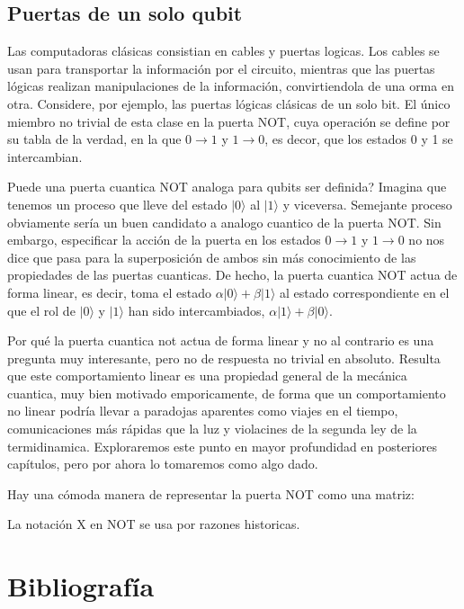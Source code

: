 \documentclass[a4paper]{article}
\begin{document}
  		\subsection{Puertas de un solo qubit}
  			Las computadoras clásicas consistian en cables y puertas logicas. Los cables se usan para transportar la información por el circuito, mientras que las puertas lógicas realizan manipulaciones de la información, convirtiendola de una orma en otra. Considere, por ejemplo, las puertas lógicas clásicas de un solo bit. El único miembro no trivial de esta clase en la puerta NOT, cuya operación se define por su tabla de la verdad, en la que $0 \rightarrow 1$ y $1 \rightarrow 0$, es decor, que los estados 0 y 1 se intercambian.
  
  Puede una puerta cuantica NOT analoga para qubits ser definida? Imagina que tenemos un proceso que lleve del estado $|0\rangle$ al $|1\rangle$ y viceversa. Semejante proceso obviamente sería un buen candidato a analogo cuantico de la puerta NOT. Sin embargo, especificar la acción de la puerta en los estados $0 \rightarrow 1$ y $1 \rightarrow 0$ no nos dice que pasa para la superposición de ambos sin más conocimiento de las propiedades de las puertas cuanticas. De hecho, la puerta cuantica NOT actua de forma linear, es decir, toma el estado $\alpha|0\rangle+ \beta|1\rangle$ al estado correspondiente en el que el rol de $|0\rangle$ y $|1\rangle$ han sido intercambiados, $\alpha|1\rangle+ \beta|0\rangle$.

Por qué la puerta cuantica not actua de forma linear y no al contrario es una pregunta muy interesante, pero no de respuesta no trivial en absoluto. Resulta que este comportamiento linear es una propiedad general de la mecánica cuantica, muy bien motivado emporicamente, de forma que un comportamiento no linear podría llevar a paradojas aparentes como viajes en el tiempo, comunicaciones más rápidas que la luz y violacines de la segunda ley de la termidinamica. Exploraremos este punto en mayor profundidad en posteriores capítulos, pero por ahora lo tomaremos como algo dado.

Hay una cómoda manera de representar la puerta NOT como una matriz:

La notación X en NOT se usa por razones historicas.
  	\appendix
	\section{Bibliografía}
		
\end{document}
